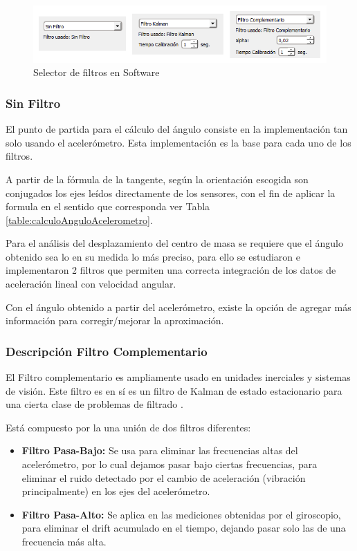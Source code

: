 \documentclass[12pt,a4paper]{article}
\begin{document}
\begin{figure}[H]
\centering
	\includegraphics[scale=0.9]{images/implementacionFiltros}
	\caption{Selector de filtros en Software}
\label{fig:selectorFiltros}
\end{figure}

\subsubsection{Sin Filtro} El punto de partida para el cálculo del ángulo consiste en la implementación tan solo usando el acelerómetro. Esta implementación es la base para cada uno de los filtros.

A partir de la fórmula de la tangente, según la orientación escogida son conjugados los ejes leídos directamente de los sensores, con el fin de aplicar la formula en el sentido que corresponda ver Tabla \ref{table:calculoAnguloAcelerometro}.


Para el análisis del desplazamiento del centro de masa se requiere que el ángulo obtenido sea lo en su medida lo más preciso, para ello se estudiaron e implementaron 2 filtros que permiten una correcta integración de los datos de aceleración lineal con velocidad angular.

Con el ángulo obtenido a partir del acelerómetro, existe la opción de agregar más información para corregir/mejorar la aproximación.


\subsubsection{Descripción Filtro Complementario}
El Filtro complementario es ampliamente usado en unidades inerciales y sistemas de visión. Este filtro es en sí es un filtro de Kalman de estado estacionario para una cierta clase de problemas de filtrado \cite{TesisUSM}.

Está compuesto por la una unión de dos filtros diferentes:
\begin{itemize}
	\item \textbf{Filtro Pasa-Bajo:} Se usa para eliminar las frecuencias altas del acelerómetro, por lo cual dejamos pasar bajo ciertas frecuencias, para eliminar el ruido detectado por el cambio de aceleración (vibración principalmente) en los ejes del acelerómetro.
	\item \textbf{Filtro Pasa-Alto:} Se aplica en las mediciones obtenidas por el giroscopio, para eliminar el drift acumulado en el tiempo, dejando pasar solo las de una frecuencia más alta.
\end{itemize}
\end{document}
